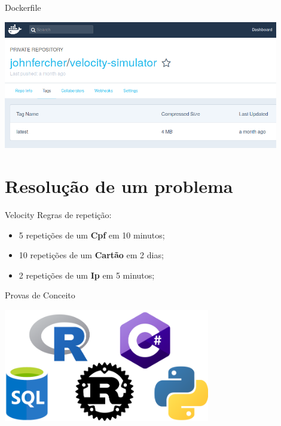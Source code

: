 \documentclass[aspectratio=169]{beamer}
\begin{document}
\begin{frame}[noframenumbering]{Dockerfile}
	\begin{center}
		\includegraphics[width=12cm]{imgs/dockerfile3.png}	
	\end{center}
\end{frame}

\section{Resolução de um problema}

\begin{frame}{Velocity}
	Regras de repetição:
	\begin{itemize}
		\item 5 repetições de um \textbf{Cpf} em 10 minutos;
		\item 10 repetições de um \textbf{Cartão} em 2 dias;
		\item 2 repetições de um \textbf{Ip} em 5 minutos;
	\end{itemize}
	
	\begin{chronology}[5]{1}{10}{80ex}[\textwidth]
	\end{chronology}
\end{frame}

\begin{frame}{Provas de Conceito}
	\begin{center}
		\includegraphics[width=9.0cm]{imgs/battle.png}	
	\end{center}
\end{frame}
\end{document}
